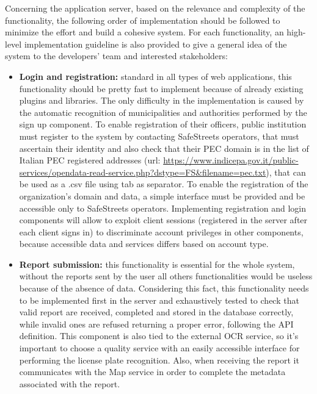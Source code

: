 Concerning the application server, based on the relevance and complexity of the functionality, the following order of implementation should be followed to minimize the effort and build a cohesive system. For each functionality, an high-level implementation guideline is also provided to give a general idea of the system to the developers' team and interested stakeholders:
\begin{itemize}
	\item \textbf{Login and registration:} standard in all types of web applications, this functionality should be pretty fast to implement because of already existing plugins and libraries. The only difficulty in the implementation is caused by the automatic recognition of municipalities and authorities performed by the sign up component. To enable registration of their officers, public institution must register to the system by contacting SafeStreets operators, that must ascertain their identity and also check that their PEC domain is in the list of Italian PEC registered addresses (url: \url{https://www.indicepa.gov.it/public-services/opendata-read-service.php?dstype=FS&filename=pec.txt}), that can be used as a .csv file using tab as separator. To enable the registration of the organization's domain and data, a simple interface must be provided and be accessible only to SafeStreets operators. Implementing registration and login components will allow to exploit client sessions (registered in the server after each client signs in) to discriminate account privileges in other components, because accessible data and services differs based on account type.
	
	\item \textbf{Report submission:} this functionality is essential for the whole system, without the reports sent by the user all others functionalities would be useless because of the absence of data. Considering this fact, this functionality needs to be implemented first in the server and exhaustively tested to check that valid report are received, completed and stored in the database correctly, while invalid ones are refused returning a proper error, following the API definition. This component is also tied to the external OCR service, so it's important to choose a quality service with an easily accessible interface for performing the license plate recognition. Also, when receiving the report it communicates with the Map service in order to complete the metadata associated with the report.
	

\end{itemize}
